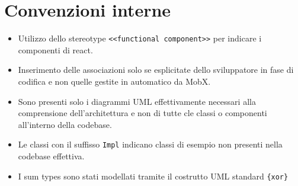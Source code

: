 \section{Convenzioni interne}
\begin{itemize}
    \item Utilizzo dello stereotype \texttt{<<functional component>>} per indicare i componenti di react.
    \item Inserimento delle associazioni solo se esplicitate dello sviluppatore in fase di codifica e non quelle gestite in automatico da MobX.
    \item Sono presenti solo i diagrammi UML effettivamente necessari alla comprensione dell'architettura e non di tutte cle classi o componenti all'interno della codebase.
    \item Le classi con il suffisso \texttt{Impl} indicano classi di esempio non presenti nella codebase effettiva.
    \item I sum types sono stati modellati tramite il costrutto UML standard \texttt{\{xor\}}
\end{itemize}
